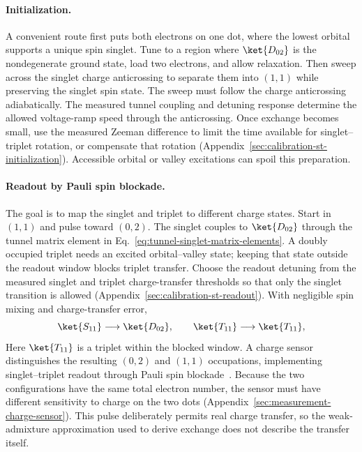 \paragraph{Initialization.}
A convenient route first puts both electrons on one dot, where the
lowest orbital supports a unique spin singlet. Tune to a region
where $\ket{D_{02}}$ is the nondegenerate ground state, load two
electrons, and allow relaxation. Then sweep across the singlet
charge anticrossing to separate them into $(1,1)$ while preserving
the singlet spin state. The sweep must follow the charge anticrossing adiabatically.
The measured tunnel coupling and detuning response determine the
allowed voltage-ramp speed through the anticrossing. Once exchange
becomes small, use the measured Zeeman difference to limit the time
available for singlet--triplet rotation, or compensate that rotation
(Appendix~\ref{sec:calibration-st-initialization}).
Accessible orbital or valley excitations can spoil this preparation.

\paragraph{Readout by Pauli spin blockade.}
The goal is to map the singlet and triplet to different charge states. Start in $(1,1)$ and
pulse toward $(0,2)$.
The singlet couples to $\ket{D_{02}}$ through the tunnel matrix
element in Eq.~\eqref{eq:tunnel-singlet-matrix-elements}.
A doubly occupied triplet needs an excited orbital--valley state;
keeping that state outside the readout window blocks triplet transfer.
Choose the readout detuning from the measured singlet and triplet
charge-transfer thresholds so that only the singlet transition is
allowed (Appendix~\ref{sec:calibration-st-readout}).
With negligible spin mixing and charge-transfer error,
\begin{equation}
  \ket{S_{11}}\longrightarrow\ket{D_{02}},\qquad
  \ket{T_{11}}\longrightarrow\ket{T_{11}},
  \label{eq:pauli-readout-map}
\end{equation}
Here $\ket{T_{11}}$ is a triplet within the blocked window.
A charge sensor distinguishes the resulting $(0,2)$ and $(1,1)$
occupations, implementing singlet--triplet readout through
Pauli spin blockade~\cite{Wu2014}.
Because the two configurations have the same total electron number,
the sensor must have different sensitivity to charge on the two
dots (Appendix~\ref{sec:measurement-charge-sensor}).
This pulse deliberately permits real charge transfer, so the
weak-admixture approximation used to derive exchange does not
describe the transfer itself.


